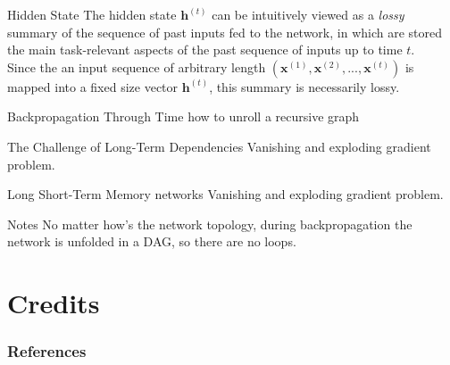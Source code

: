 \documentclass[aspectratio=169]{beamer}
\begin{document}

\begin{frame}{Hidden State}
The hidden state $\bm{h}^{(t)}$ can be intuitively viewed as a \textit{lossy} summary of the sequence of past inputs fed to the network, in which are stored the main task-relevant aspects of the past sequence of inputs up to time $t$.\\
\vspace{0.5cm}
Since the an input sequence of arbitrary length $(\bm{x}^{(1)}, \bm{x}^{(2)}, ..., \bm{x}^{(t)})$ is mapped into a fixed size vector $\bm{h}^{(t)}$, this summary is necessarily lossy.
\end{frame}


\begin{frame}{Backpropagation Through Time}
how to unroll a recursive graph
\end{frame}


\begin{frame}{The Challenge of Long-Term Dependencies}
Vanishing and exploding gradient problem.
\end{frame}


\begin{frame}{Long Short-Term Memory networks}
Vanishing and exploding gradient problem.
\end{frame}


\begin{frame}{Notes}
No matter how's the network topology, during backpropagation the network is unfolded in a DAG, so there are no loops.
\end{frame}


\section{Credits}



\begin{frame}[t, allowframebreaks]
\frametitle{References}


\end{frame}
\end{document}
